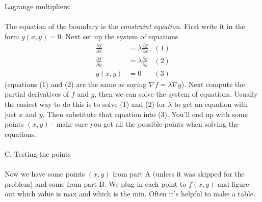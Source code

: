 \documentclass{article}
\begin{document}
Lagrange multipliers: \\ \\
The equation of the boundary is the \textit{constraint equation}. First write it in the form $g(x,y) = 0$. Next set up the system of equations
\begin{align*}
    \frac{\partial f}{\partial x} &= \lambda \frac{\partial g}{\partial x} &(1) \\
    \frac{\partial f}{\partial y} &= \lambda \frac{\partial g}{\partial y} &(2) \\
    g(x,y) &= 0 &(3)
\end{align*}
(equations (1) and (2) are the same as saying $\nabla f = \lambda \nabla g$). Next compute the partial derivatives of $f$ and $g$, then we can solve the system of equations. Usually the easiest way to do this is to solve (1) and (2) for $\lambda$ to get an equation with just $x$ and $y$. Then substitute that equation into (3). You'll end up with some points $(x,y)$ - make sure you get all the possible points when solving the equations. \\ \\
C. Testing the points  \\ \\
Now we have some points $(x,y)$ from part A (unless it was skipped for the problem) and some from part B. We plug in each point to $f(x,y)$ and figure out which value is max and which is the min. Often it's helpful to make a table. 
\end{document}
